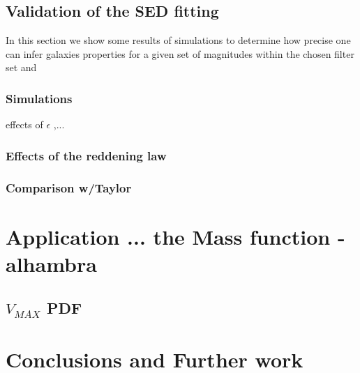 \documentclass[9pt]{memoir}
\begin{document}
\section{Validation of the SED fitting}

In this section we show some results of simulations to determine how precise one can infer galaxies properties for a given set of magnitudes within the chosen filter set and 


\subsection{Simulations}

effects of $\epsilon$ ,... 

\subsection{Effects of the reddening law}


\subsection{Comparison w/Taylor}





\chapter{Application ... the Mass function - alhambra}


\section{$V_{MAX}$ PDF}
\label{sec:vmax}



\chapter{Conclusions and Further work}




\end{document}
